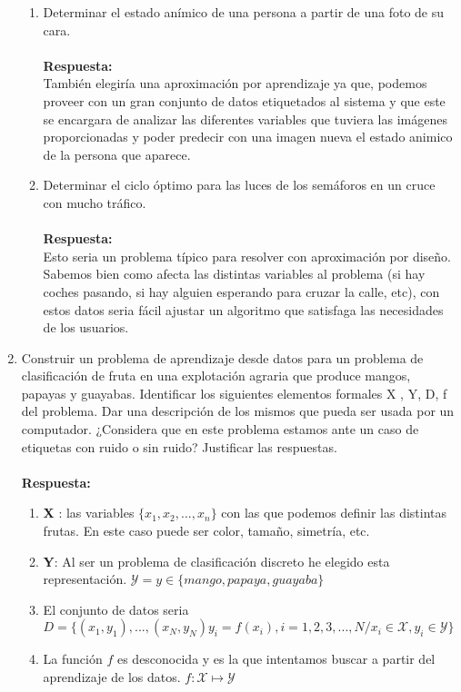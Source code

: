 \documentclass[12pt,a4paper]{article}
\begin{document}
\begin{enumerate}
\begin{enumerate}
		\item Determinar el estado anímico de una persona a partir de una foto de su cara.\\\\		\textbf{Respuesta:}\\
		También elegiría una aproximación por aprendizaje ya que, podemos proveer con un gran conjunto de datos etiquetados al sistema y que este se encargara de analizar las diferentes variables  que tuviera las imágenes proporcionadas y poder predecir con una imagen nueva el estado animico de la persona que aparece. 
		\item Determinar el ciclo óptimo para las luces de los semáforos en un cruce con mucho tráfico.\\\\		\textbf{Respuesta:}\\
		Esto seria un problema típico para resolver con aproximación por diseño. Sabemos bien como afecta las distintas variables al problema (si hay coches pasando, si  hay alguien esperando para cruzar la calle, etc), con estos datos seria fácil ajustar un algoritmo que satisfaga las necesidades de los usuarios.
	\end{enumerate}
	\item Construir un problema de aprendizaje desde datos para un problema de clasificación de fruta en una explotación agraria que produce mangos, papayas y guayabas. Identificar los siguientes elementos formales X , Y, D, f del problema. Dar una descripción de los mismos que pueda ser usada por un computador. ¿Considera que en este problema estamos ante un caso de etiquetas con ruido o sin ruido? Justificar las respuestas.\\\\
		\textbf{Respuesta:}\\
		\begin{enumerate}
			\item \textbf{X} : las variables $\{x_1,x_2,...,x_n\}$ con las que podemos definir las distintas frutas. En este caso puede ser color, tamaño, simetría, etc. 
			\item \textbf{Y}: Al ser un problema de clasificación discreto he elegido esta representación. $\mathcal{Y} = y \in \{mango, papaya, guayaba\}$
			\item El conjunto de datos seria $D = \{(x_1,y_1),...,(x_N, y_N) y_i=f(x_i),i=1,2,3,...,N/x_i \in \mathcal{X},y_i \in \mathcal{Y}\} $ 
			\item La función $f$ es desconocida y es la que intentamos buscar a partir del aprendizaje de los datos. $f : \mathcal{X} \mapsto \mathcal{Y}$

\end{enumerate}
\end{enumerate}
\end{document}

